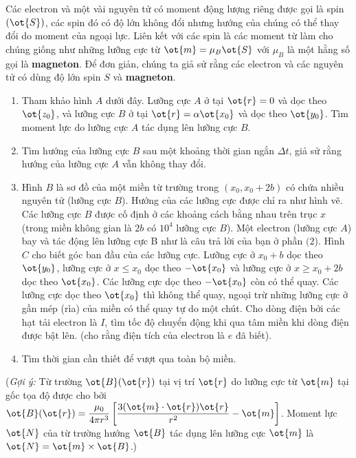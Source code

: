 \begin{vd}
Các electron và một vài nguyên tử có moment động lượng riêng được gọi là spin $(\ot{S})$, các spin đó có độ lớn không đổi nhưng hướng của chúng có thể thay đổi do moment của ngoại lực. Liên kết với các spin là các moment từ làm cho chúng giống như những lưỡng cực từ $\ot{m}=\mu_{B}\ot{S}$ với $\mu_{B}$ là một hằng số gọi là \textbf{magneton}. Để đơn giản, chúng ta giả sử rằng các electron và các nguyên tử có dùng độ lớn spin $S$ và \textbf{magneton}.
\begin{enumerate}[1) ]
    \item Tham khảo hình $A$ dưới đây. Lưỡng cực $A$ ở tại $\ot{r}=0$ và dọc theo $\ot{z_0}$, và lưỡng cực $B$ ở tại $\ot{r}=\alpha\ot{x_0}$ và dọc theo $\ot{y_0}$. Tìm moment lực do lưỡng cực $A$ tác dụng lên lưỡng cực $B$.
    \item Tìm hướng của lưỡng cực $B$ sau một khoảng thời gian ngắn $\Delta t$, giả sử rằng hướng của lưỡng cực $A$ vẫn không thay đổi.
    \item Hình $B$ là sơ đồ của một miền từ trường trong $(x_0,x_0+2b)$ có chứa nhiều nguyên tử (lưỡng cực $B$). Hướng của các lưỡng cực được chỉ ra như hình vẽ. Các lưỡng cực $B$ được cố định ở các khoảng cách bằng nhau trên trục $x$ (trong miền không gian là $2b$ có $10^4$ lưỡng cực $B$). Một electron (lưỡng cực $A$) bay và tác động lên lưỡng cực B như là câu trả lời của bạn ở phần $(2$). Hình $C$  cho biết góc ban đầu của các lưỡng cực. Lưỡng cực ở $x_0+b$ dọc theo $\ot{y_0}$, lưỡng cực ở $x\leq x_0$ dọc theo $-\ot{x_0}$ và lưỡng cực ở $x\geq x_0+2b$ dọc theo $\ot{x_0}$. Các lưỡng cực dọc theo $-\ot{x_0}$ còn có thể quay. Các lưỡng cực dọc theo $\ot{x_0}$ thì không thể quay, ngoại trừ những lưỡng cực ở gần mép (rìa) của miền có thể quay tự do một chút. Cho dòng điện bởi các hạt tải electron là $I$, tìm tốc độ chuyển động khi qua tâm miền khi dòng điện được bật lên. (cho rằng điện tích của electron là $e$ đã biết). 
    \item Tìm thời gian cần thiết để vượt qua toàn bộ miền.
    \end{enumerate}
(\textit{Gợi ý:} Từ trường $\ot{B}(\ot{r})$ tại vị trí $\ot{r}$ do lưỡng cực từ $\ot{m}$ tại gốc tọa độ được cho bởi $\ot{B}(\ot{r})=\dfrac{\mu_0}{4\pi r^3}\left[\dfrac{3(\ot{m}\cdot\ot{r})\ot{r}}{r^2}-\ot{m}\right]$. Moment lực $\ot{N}$ của từ trường hướng $\ot{B}$ tác dụng lên lưỡng cực $\ot{m}$ là $\ot{N}=\ot{m}\times\ot{B}$.)
\begin{center}




\end{center}
\end{vd}
